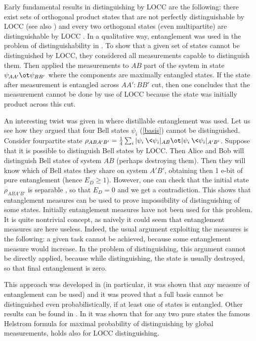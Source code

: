 \documentclass[twocolumn,aps,rmp]{revtex4}
\begin{document}
Early fundamental results in distinguishing by LOCC are the following:
there exist sets of orthogonal product states that are not perfectly
distinguishable by LOCC \cite{Bennett-nlwe} (see also \cite{WH2002})
and every two orthogonal states (even multipartite) are
distinguishable by LOCC \cite{Walgate-twoent}. In a qualitative way,
entanglement was used in the problem of distinguishability in
\cite{hiding-prl}.  To show that a given set of states cannot be
distinguished by LOCC, they considered all measurements capable to
distinguish them. Then applied the measurements to $AB$ part of the
system in state $\psi_{AA'}\ot \psi_{BB'}$ where the components are
maximally entangled states. If the state after measurement is
entangled across $AA':BB'$ cut, then one concludes that the measurement cannot be done by
use of LOCC because the state was initially product across this cut.

An interesting twist was given in \cite{BellPRL} where distillable
entanglement was used. Let us see how they argued that four Bell
states $\psi_i$ (\ref{basis}) cannot be distinguished. Consider fourpartite state
$\rho_{ABA'B'}={1\over 4}\sum_i |\psi_i\>\<\psi_i|_{AB} \ot
|\psi_i\>\<\psi_i|_{A'B'}$. Suppose that it is possible to distinguish
Bell states by LOCC. Then Alice and Bob will distinguish Bell states
of system $AB$ (perhaps destroying them). Then they will know which of
Bell states they share on system $A'B'$, obtaining then 1 e-bit of
pure entanglement (hence $E_D\geq 1$). However, one can check that the
initial state $\rho_{ABA'B'}$ is separable \cite{Smolin-unlock}, so that $E_D=0$
and we get a contradiction.  This shows that entanglement measures can
be used to prove impossibility of distinguishing of some
states. Initially entanglement measures have not been used for this
problem. It is quite nontrivial concept, as naively it could seem that
entanglement measures are here useless. Indeed, the usual argument
exploiting the measures is the following: a given task cannot be
achieved, because some entanglement measure would increase. In the
problem of distinguishing, this argument cannot be directly applied,
because while distinguishing, the state is usually destroyed, so that
final entanglement is zero.

This approach was developed in \cite{morenon} (in particular, it was shown
that any measure of entanglement can be used) and it was proved that a
full basis cannot be distinguished even probabilistically, if at least
one of states is entangled. Other results can be found in
\cite{VirmaniSPM2001-locc-discr, Fan-LOCCdist,Nathanson-LOCCdist}. In
\cite{VirmaniSPM2001-locc-discr} it was shown that for any two pure
states the famous Helstrom formula for maximal probability of distinguishing
by global measurements, holds also for LOCC distinguishing.
\end{document}
